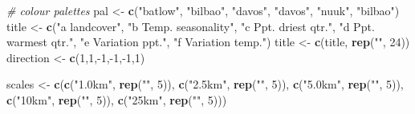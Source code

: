 \documentclass[]{article}
\newenvironment{Shaded}{}{}
\newcommand{\CommentTok}[1]{\textcolor[rgb]{0.38,0.63,0.69}{\textit{#1}}}
\newcommand{\DecValTok}[1]{\textcolor[rgb]{0.25,0.63,0.44}{#1}}
\newcommand{\KeywordTok}[1]{\textcolor[rgb]{0.00,0.44,0.13}{\textbf{#1}}}
\newcommand{\NormalTok}[1]{#1}
\newcommand{\OperatorTok}[1]{\textcolor[rgb]{0.40,0.40,0.40}{#1}}
\newcommand{\StringTok}[1]{\textcolor[rgb]{0.25,0.44,0.63}{#1}}
\begin{document}
\begin{Shaded}
\begin{Highlighting}[]
\CommentTok{# colour palettes}
\NormalTok{pal <-}\StringTok{ }\KeywordTok{c}\NormalTok{(}\StringTok{"batlow"}\NormalTok{, }\StringTok{"bilbao"}\NormalTok{, }\StringTok{"davos"}\NormalTok{, }\StringTok{"davos"}\NormalTok{, }\StringTok{"nuuk"}\NormalTok{, }\StringTok{"bilbao"}\NormalTok{)}
\NormalTok{title <-}\StringTok{ }\KeywordTok{c}\NormalTok{(}\StringTok{"a landcover"}\NormalTok{,}
           \StringTok{"b Temp. seasonality"}\NormalTok{,}
           \StringTok{"c Ppt. driest qtr."}\NormalTok{,}
           \StringTok{"d Ppt. warmest qtr."}\NormalTok{,}
           \StringTok{"e Variation ppt."}\NormalTok{,}
           \StringTok{"f Variation temp."}\NormalTok{)}
\NormalTok{title <-}\StringTok{ }\KeywordTok{c}\NormalTok{(title, }\KeywordTok{rep}\NormalTok{(}\StringTok{""}\NormalTok{, }\DecValTok{24}\NormalTok{))}
\NormalTok{direction <-}\StringTok{ }\KeywordTok{c}\NormalTok{(}\DecValTok{1}\NormalTok{,}\DecValTok{1}\NormalTok{,}\OperatorTok{-}\DecValTok{1}\NormalTok{,}\OperatorTok{-}\DecValTok{1}\NormalTok{,}\OperatorTok{-}\DecValTok{1}\NormalTok{,}\DecValTok{1}\NormalTok{)}

\NormalTok{scales <-}\StringTok{ }\KeywordTok{c}\NormalTok{(}\KeywordTok{c}\NormalTok{(}\StringTok{"1.0km"}\NormalTok{, }\KeywordTok{rep}\NormalTok{(}\StringTok{""}\NormalTok{, }\DecValTok{5}\NormalTok{)), }\KeywordTok{c}\NormalTok{(}\StringTok{"2.5km"}\NormalTok{, }\KeywordTok{rep}\NormalTok{(}\StringTok{""}\NormalTok{, }\DecValTok{5}\NormalTok{)), }
            \KeywordTok{c}\NormalTok{(}\StringTok{"5.0km"}\NormalTok{, }\KeywordTok{rep}\NormalTok{(}\StringTok{""}\NormalTok{, }\DecValTok{5}\NormalTok{)), }\KeywordTok{c}\NormalTok{(}\StringTok{"10km"}\NormalTok{, }\KeywordTok{rep}\NormalTok{(}\StringTok{""}\NormalTok{, }\DecValTok{5}\NormalTok{)), }
            \KeywordTok{c}\NormalTok{(}\StringTok{"25km"}\NormalTok{, }\KeywordTok{rep}\NormalTok{(}\StringTok{""}\NormalTok{, }\DecValTok{5}\NormalTok{)))}


\end{Highlighting}
\end{Shaded}
\end{document}
